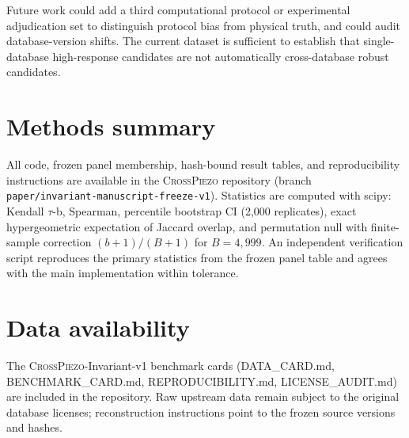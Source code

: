 \documentclass[11pt]{article}
\begin{document}
Future work could add a third computational protocol or experimental adjudication set to distinguish protocol bias from physical truth, and could audit database-version shifts. The current dataset is sufficient to establish that single-database high-response candidates are not automatically cross-database robust candidates.

\section{Methods summary}

All code, frozen panel membership, hash-bound result tables, and reproducibility instructions are available in the \textsc{CrossPiezo} repository (branch \texttt{paper/invariant-manuscript-freeze-v1}). Statistics are computed with scipy: Kendall $\tau$-b, Spearman, percentile bootstrap CI (2,000 replicates), exact hypergeometric expectation of Jaccard overlap, and permutation null with finite-sample correction $(b+1)/(B+1)$ for $B=4,999$. An independent verification script reproduces the primary statistics from the frozen panel table and agrees with the main implementation within tolerance.

\section{Data availability}

The \textsc{CrossPiezo}-Invariant-v1 benchmark cards (DATA\_CARD.md, BENCHMARK\_CARD.md, REPRODUCIBILITY.md, LICENSE\_AUDIT.md) are included in the repository. Raw upstream data remain subject to the original database licenses; reconstruction instructions point to the frozen source versions and hashes.



\end{document}
